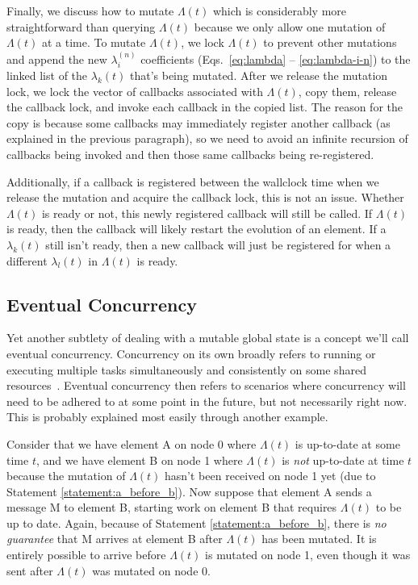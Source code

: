 \begin{bibunit}[unsrtnat]
Finally, we discuss how to mutate $\Lambda(t)$ which is considerably more
straightforward than querying $\Lambda(t)$ because we only allow one mutation of
$\Lambda(t)$ at a time. To mutate $\Lambda(t)$, we lock $\Lambda(t)$ to prevent
other mutations and append the new $\lambda_i^{(n)}$ coefficients
(Eqs.~\eqref{eq:lambda} -- \eqref{eq:lambda-i-n}) to the linked list of the
$\lambda_k(t)$ that's being mutated. After we release the mutation lock, we lock
the vector of callbacks associated with $\Lambda(t)$, copy them, release the
callback lock, and invoke each callback in the copied list. The reason for the
copy is because some callbacks may immediately register another callback (as
explained in the previous paragraph), so we need to avoid an infinite recursion
of callbacks being invoked and then those same callbacks being re-registered.

Additionally, if a callback is registered between the wallclock time when we
release the mutation and acquire the callback lock, this is not an issue.
Whether $\Lambda(t)$ is ready or not, this newly registered callback will still
be called. If $\Lambda(t)$ is ready, then the callback will likely restart the
evolution of an element. If a $\lambda_k(t)$ still isn't ready, then a new
callback will just be registered for when a different $\lambda_l(t)$ in
$\Lambda(t)$ is ready.

\subsection{Eventual Concurrency}

Yet another subtlety of dealing with a mutable global state is a concept we'll
call eventual concurrency. Concurrency on its own broadly refers to running or
executing multiple tasks simultaneously and consistently on some shared
resources~\cite{10.5555/174770}. Eventual concurrency then refers to scenarios
where concurrency will need to be adhered to at some point in the future, but
not necessarily right now. This is probably explained most easily through
another
example.

Consider that we have element A on node 0 where $\Lambda(t)$ is up-to-date at
some time $t$, and we have element B on node 1 where $\Lambda(t)$ is
\textit{not} up-to-date at time $t$ because the mutation of $\Lambda(t)$ hasn't
been received on node 1 yet (due to Statement \ref{statement:a_before_b}).
Now suppose that element A sends a message M to element B, starting work on
element B that requires $\Lambda(t)$ to be up to date. Again, because of
Statement \ref{statement:a_before_b}, there is \textit{no guarantee} that M
arrives at element B after $\Lambda(t)$ has been mutated. It is entirely
possible to arrive before $\Lambda(t)$ is mutated on node 1, even though it was
sent after $\Lambda(t)$ was mutated on node 0.


\end{bibunit}
